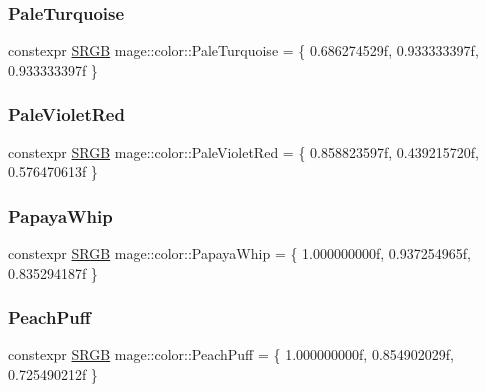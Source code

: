 \hypertarget{namespacemage_1_1color_ab93738a4262f4ae816f55dfd79a68859}{}\label{namespacemage_1_1color_ab93738a4262f4ae816f55dfd79a68859} 
\subsubsection{\texorpdfstring{Pale\+Turquoise}{PaleTurquoise}}
{\footnotesize\ttfamily constexpr \hyperlink{structmage_1_1_s_r_g_b}{S\+R\+GB} mage\+::color\+::\+Pale\+Turquoise = \{ 0.\+686274529f, 0.\+933333397f, 0.\+933333397f \}}

\hypertarget{namespacemage_1_1color_a0338af060f5f8ddc72a2fbcd0ed0cb6f}{}\label{namespacemage_1_1color_a0338af060f5f8ddc72a2fbcd0ed0cb6f} 
\subsubsection{\texorpdfstring{Pale\+Violet\+Red}{PaleVioletRed}}
{\footnotesize\ttfamily constexpr \hyperlink{structmage_1_1_s_r_g_b}{S\+R\+GB} mage\+::color\+::\+Pale\+Violet\+Red = \{ 0.\+858823597f, 0.\+439215720f, 0.\+576470613f \}}

\hypertarget{namespacemage_1_1color_a3752b77f8a90782256f837ad98aca12b}{}\label{namespacemage_1_1color_a3752b77f8a90782256f837ad98aca12b} 
\subsubsection{\texorpdfstring{Papaya\+Whip}{PapayaWhip}}
{\footnotesize\ttfamily constexpr \hyperlink{structmage_1_1_s_r_g_b}{S\+R\+GB} mage\+::color\+::\+Papaya\+Whip = \{ 1.\+000000000f, 0.\+937254965f, 0.\+835294187f \}}

\hypertarget{namespacemage_1_1color_aa6d4c863a4bef4fea1584b396f5efa3f}{}\label{namespacemage_1_1color_aa6d4c863a4bef4fea1584b396f5efa3f} 
\subsubsection{\texorpdfstring{Peach\+Puff}{PeachPuff}}
{\footnotesize\ttfamily constexpr \hyperlink{structmage_1_1_s_r_g_b}{S\+R\+GB} mage\+::color\+::\+Peach\+Puff = \{ 1.\+000000000f, 0.\+854902029f, 0.\+725490212f \}}

